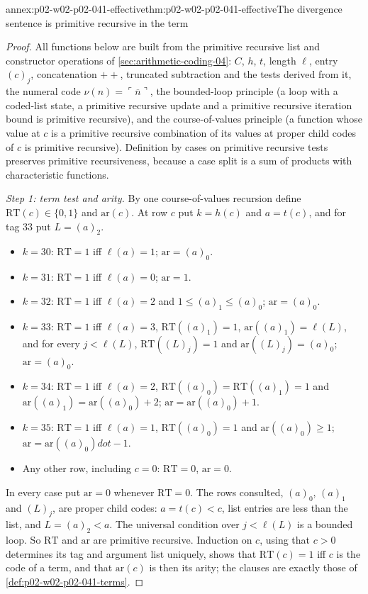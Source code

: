 \begin{annexitem}{annex:p02-w02-p02-041-effective}{thm:p02-w02-p02-041-effective}{The divergence sentence is primitive recursive in the term}
\begin{proof}
All functions below are built from the primitive recursive list and
constructor operations of \cref{sec:arithmetic-coding-04}: \(C\), \(h\),
\(t\), length \(\ell\), entry \((c)_j\), concatenation \(\mathbin{+\!\!+}\),
truncated subtraction and the tests derived from it, the numeral code
\(\nu(n)=\ulcorner\overline n\urcorner\), the bounded-loop principle (a loop with
a coded-list state, a primitive recursive update and a primitive recursive
iteration bound is primitive recursive), and the course-of-values principle
(a function whose value at \(c\) is a primitive recursive combination of its
values at proper child codes of \(c\) is primitive recursive).  Definition by
cases on primitive recursive tests preserves primitive recursiveness, because a
case split is a sum of products with characteristic functions.

\emph{Step 1: term test and arity.}  By one course-of-values recursion define
\(\mathrm{RT}(c)\in\{0,1\}\) and \(\mathrm{ar}(c)\).  At row \(c\) put
\(k=h(c)\) and \(a=t(c)\), and for tag \(33\) put \(L=(a)_2\).
\begin{itemize}
 \item \(k=30\): \(\mathrm{RT}=1\) iff \(\ell(a)=1\); \(\mathrm{ar}=(a)_0\).
 \item \(k=31\): \(\mathrm{RT}=1\) iff \(\ell(a)=0\); \(\mathrm{ar}=1\).
 \item \(k=32\): \(\mathrm{RT}=1\) iff \(\ell(a)=2\) and
   \(1\le(a)_1\le(a)_0\); \(\mathrm{ar}=(a)_0\).
 \item \(k=33\): \(\mathrm{RT}=1\) iff \(\ell(a)=3\),
   \(\mathrm{RT}((a)_1)=1\), \(\mathrm{ar}((a)_1)=\ell(L)\), and for every
   \(j<\ell(L)\), \(\mathrm{RT}((L)_j)=1\) and \(\mathrm{ar}((L)_j)=(a)_0\);
   \(\mathrm{ar}=(a)_0\).
 \item \(k=34\): \(\mathrm{RT}=1\) iff \(\ell(a)=2\),
   \(\mathrm{RT}((a)_0)=\mathrm{RT}((a)_1)=1\) and
   \(\mathrm{ar}((a)_1)=\mathrm{ar}((a)_0)+2\); \(\mathrm{ar}=\mathrm{ar}((a)_0)+1\).
 \item \(k=35\): \(\mathrm{RT}=1\) iff \(\ell(a)=1\), \(\mathrm{RT}((a)_0)=1\)
   and \(\mathrm{ar}((a)_0)\ge1\); \(\mathrm{ar}=\mathrm{ar}((a)_0)\mathbin{dot{-}}1\).
 \item Any other row, including \(c=0\): \(\mathrm{RT}=0\), \(\mathrm{ar}=0\).
\end{itemize}
In every case put \(\mathrm{ar}=0\) whenever \(\mathrm{RT}=0\).  The rows consulted, \((a)_0\), \((a)_1\) and
\((L)_j\), are proper child codes: \(a=t(c)<c\), list entries are less than
the list, and \(L=(a)_2<a\).  The universal condition over \(j<\ell(L)\) is a
bounded loop.  So \(\mathrm{RT}\) and \(\mathrm{ar}\) are primitive recursive.
Induction on \(c\), using that \(c>0\) determines its tag and argument list
uniquely, shows that \(\mathrm{RT}(c)=1\) iff \(c\) is the code of a term, and
that \(\mathrm{ar}(c)\) is then its arity; the clauses are exactly those of
\cref{def:p02-w02-p02-041-terms}.


\end{proof}
\end{annexitem}
